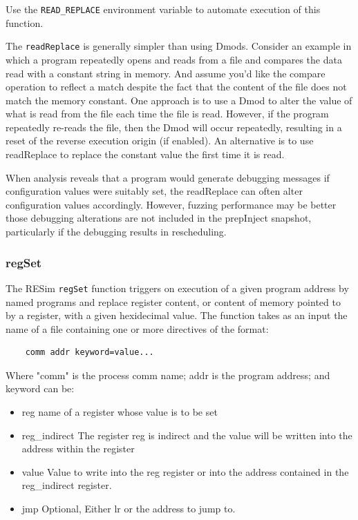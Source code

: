 \documentclass[titlepage]{article}
\begin{document}
Use the {\tt READ\_REPLACE} environment variable to automate execution of this function.

The {\tt readReplace} is generally simpler than using Dmods.  Consider an example in which a program
repeatedly opens and reads from a file and compares the data read with a constant string in memory.
And assume you'd like the compare operation to reflect a match despite the fact that the content of
the file does not match the memory constant.  One approach is to use a Dmod to alter the value of what
is read from the file each time the file is read.  However, if the program repeatedly re-reads the file,
then the Dmod will occur repeatedly, resulting in a reset of the reverse execution origin (if enabled).
An alternative is to use readReplace to replace the constant value the first time it is read.  

When analysis reveals that a program would generate debugging messages if configuration values were
suitably set, the readReplace can often alter configuration values accordingly.  However, fuzzing performance
may be better those debugging alterations are not included in the prepInject snapshot, particularly if the debugging
results in rescheduling.

\subsubsection{regSet}
\label{reg-set}
The RESim {\tt regSet} function triggers on execution of a given program address
by named programs and replace register content, or content of memory pointed to by a register,  with a given hexidecimal value.  The function takes as an
input the name of a file containing one or more directives of the format:
\begin{verbatim}
    comm addr keyword=value...
\end{verbatim}
Where "comm" is the process comm name; addr is the program address; and keyword can be:
\begin{itemize}
\item {reg} name of a register whose value is to be set
\item {reg\_indirect} The register reg is indirect and the value will be written into the address within the register
\item {value} Value to write into the reg register or into the address contained in the reg\_indirect register.
\item {jmp} Optional, Either lr or the address to jump to.
\end{itemize}
\end{document}

